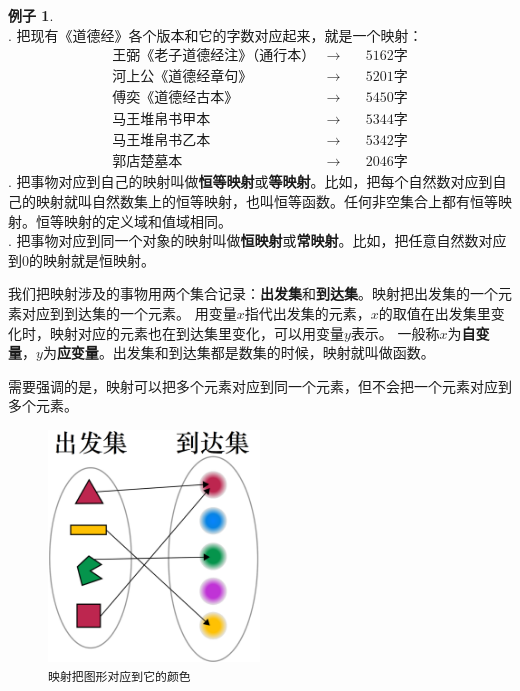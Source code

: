 \documentclass[12pt,UTF8]{ctexbook}
\theoremstyle{definition}
\newtheorem{ex}{例子}[section]
\theoremstyle{plain}
\begin{document}
\begin{ex}\label{ex:2-2-0}
    \mbox{} \\ 
    . 把现有《道德经》各个版本和它的字数对应起来，就是一个映射：
    $$
    \begin{array}{lll}
        \mbox{王弼《老子道德经注》（通行本）} &\longrightarrow &\quad 5162\mbox{字} \\
        \mbox{河上公《道德经章句》} &\longrightarrow &\quad 5201\mbox{字} \\ 
        \mbox{傅奕《道德经古本》} &\longrightarrow &\quad 5450\mbox{字} \\
        \mbox{马王堆帛书甲本} &\longrightarrow &\quad 5344\mbox{字} \\
        \mbox{马王堆帛书乙本} &\longrightarrow &\quad 5342\mbox{字} \\
        \mbox{郭店楚墓本} &\longrightarrow &\quad 2046\mbox{字}
    \end{array}
    $$
    . 把事物对应到自己的映射叫做\textbf{恒等映射}或\textbf{等映射}。比如，把每个自然数对应到自己的映射就叫自然数集上的恒等映射，也叫恒等函数。任何非空集合上都有恒等映射。恒等映射的定义域和值域相同。\\
    . 把事物对应到同一个对象的映射叫做\textbf{恒映射}或\textbf{常映射}。比如，把任意自然数对应到$0$的映射就是恒映射。
\end{ex}

我们把映射涉及的事物用两个集合记录：\textbf{出发集}和\textbf{到达集}。映射把出发集的一个元素对应到到达集的一个元素。
用变量$x$指代出发集的元素，$x$的取值在出发集里变化时，映射对应的元素也在到达集里变化，可以用变量$y$表示。
一般称$x$为\textbf{自变量}，$y$为\textbf{应变量}。出发集和到达集都是数集的时候，映射就叫做函数。

需要强调的是，映射可以把多个元素对应到同一个元素，但不会把一个元素对应到多个元素。

\begin{figure}[h]
    \vspace{4pt}
    \centering
    \includegraphics[width=0.5\textwidth]{tu/映射1.png}
    \caption*{\texttt{映射把图形对应到它的颜色}}
\end{figure}
\end{document}
